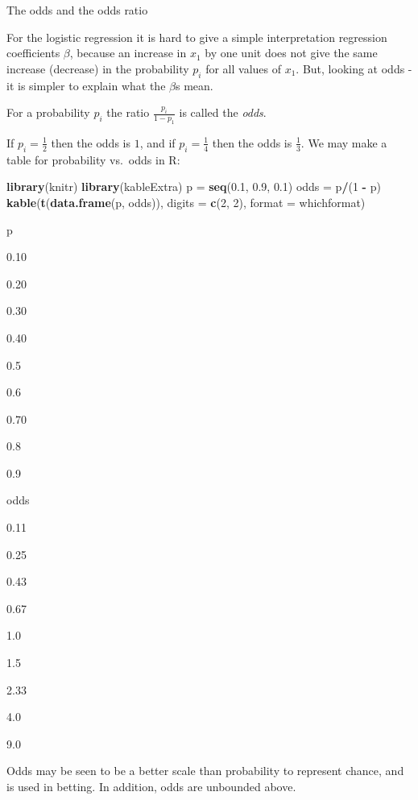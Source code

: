 \documentclass[10pt,ignorenonframetext,]{beamer}
\newenvironment{Shaded}{\begin{snugshade}}{\end{snugshade}}
\newcommand{\KeywordTok}[1]{\textcolor[rgb]{0.13,0.29,0.53}{\textbf{#1}}}
\newcommand{\DataTypeTok}[1]{\textcolor[rgb]{0.13,0.29,0.53}{#1}}
\newcommand{\DecValTok}[1]{\textcolor[rgb]{0.00,0.00,0.81}{#1}}
\newcommand{\FloatTok}[1]{\textcolor[rgb]{0.00,0.00,0.81}{#1}}
\newcommand{\StringTok}[1]{\textcolor[rgb]{0.31,0.60,0.02}{#1}}
\newcommand{\OperatorTok}[1]{\textcolor[rgb]{0.81,0.36,0.00}{\textbf{#1}}}
\newcommand{\NormalTok}[1]{#1}
\begin{document}
\begin{frame}[fragile]

\begin{block}{The odds and the odds ratio}

For the logistic regression it is hard to give a simple interpretation
regression coefficients \(\beta\), because an increase in \(x_1\) by one
unit does not give the same increase (decrease) in the probability
\(p_i\) for all values of \(x_1\). But, looking at odds - it is simpler
to explain what the \(\beta\)s mean.

For a probability \(p_i\) the ratio \(\frac{p_i}{1-p_1}\) is called the
\emph{odds}.

If \(p_i=\frac{1}{2}\) then the odds is \(1\), and if
\(p_i=\frac{1}{4}\) then the odds is \(\frac{1}{3}\). We may make a
table for probability vs.~odds in R:

\begin{Shaded}
\begin{Highlighting}[]
\KeywordTok{library}\NormalTok{(knitr)}
\KeywordTok{library}\NormalTok{(kableExtra)}
\NormalTok{p =}\StringTok{ }\KeywordTok{seq}\NormalTok{(}\FloatTok{0.1}\NormalTok{, }\FloatTok{0.9}\NormalTok{, }\FloatTok{0.1}\NormalTok{)}
\NormalTok{odds =}\StringTok{ }\NormalTok{p}\OperatorTok{/}\NormalTok{(}\DecValTok{1} \OperatorTok{-}\StringTok{ }\NormalTok{p)}
\KeywordTok{kable}\NormalTok{(}\KeywordTok{t}\NormalTok{(}\KeywordTok{data.frame}\NormalTok{(p, odds)), }\DataTypeTok{digits =} \KeywordTok{c}\NormalTok{(}\DecValTok{2}\NormalTok{, }\DecValTok{2}\NormalTok{), }\DataTypeTok{format =}\NormalTok{ whichformat)}
\end{Highlighting}
\end{Shaded}

p

0.10

0.20

0.30

0.40

0.5

0.6

0.70

0.8

0.9

odds

0.11

0.25

0.43

0.67

1.0

1.5

2.33

4.0

9.0

Odds may be seen to be a better scale than probability to represent
chance, and is used in betting. In addition, odds are unbounded above.

\end{block}

\end{frame}
\end{document}

